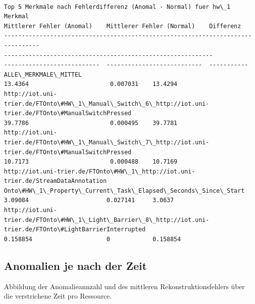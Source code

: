 \documentclass[11pt]{article}
\begin{document}
    \begin{Verbatim}[commandchars=\\\{\}]

Top 5 Merkmale nach Fehlerdifferenz (Anomal - Normal) fuer hw\_1
Merkmal
Mittlerer Fehler (Anomal)    Mittlerer Fehler (Normal)    Differenz
--------------------------------------------------------------------------------
-----------------------------------------------------------
---------------------------  ---------------------------  -----------
ALLE\_MERKMALE\_MITTEL
13.4364                       0.007031    13.4294
http://iot.uni-trier.de/FTOnto\#HW\_1\_Manual\_Switch\_6\_http://iot.uni-
trier.de/FTOnto\#ManualSwitchPressed
39.7786                       0.000495    39.7781
http://iot.uni-trier.de/FTOnto\#HW\_1\_Manual\_Switch\_7\_http://iot.uni-
trier.de/FTOnto\#ManualSwitchPressed
10.7173                       0.000488    10.7169
http://iot.uni-trier.de/FTOnto\#HW\_1\_http://iot.uni-trier.de/StreamDataAnnotation
Onto\#HW\_1\_Property\_Current\_Task\_Elapsed\_Seconds\_Since\_Start
3.09084                      0.027141     3.0637
http://iot.uni-trier.de/FTOnto\#HW\_1\_Light\_Barrier\_8\_http://iot.uni-
trier.de/FTOnto\#LightBarrierInterrupted
0.158854                     0            0.158854
    \end{Verbatim}

    \subsection{Anomalien je nach der
Zeit}\label{anomalien-je-nach-der-zeit}

Abbildung der Anomalieannzahl und des mittleren Rekonstruktionsfehlers
über die verstrichene Zeit pro Ressource.
\end{document}

